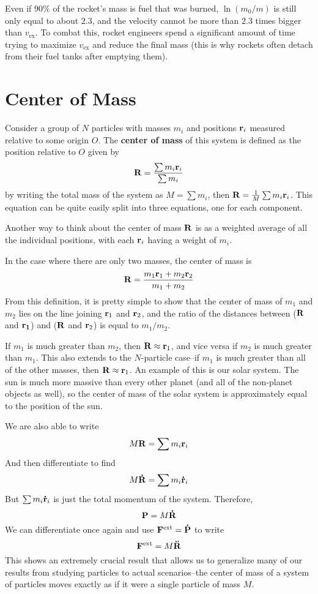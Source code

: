 Even if $90\%$ of the rocket's mass is fuel that was burned, $\ln(m_0/m)$ is still only equal to about $2.3$, and the velocity cannot be more than $2.3$ times bigger than $v_\text{ex}$. To combat this, rocket engineers spend a significant amount of time trying to maximize $v_\text{ex}$ and reduce the final mass (this is why rockets often detach from their fuel tanks after emptying them). 

\section{Center of Mass}
Consider a group of $N$ particles with masses $m_i$ and positions $\mathbf{r}_i$ measured relative to some origin $O$. The \textbf{center of mass} of this system is defined as the position relative to $O$ given by
\[ \mathbf{R} = \frac{\sum m_i\mathbf{r}_i}{\sum m_i}\]
by writing the total mass of the system as $M = \sum m_i$, then $\mathbf{R} = \frac{1}{M}\sum m_i\mathbf{r}_i$. This equation can be quite easily split into three equations, one for each component.

Another way to think about the center of mass $\mathbf{R}$ is as a weighted average of all the individual positions, with each $\mathbf{r}_i$ having a weight of $m_i$. 

In the case where there are only two masses, the center of mass is
\[ \mathbf{R} = \frac{m_1\mathbf{r}_1 + m_2\mathbf{r}_2}{m_1+m_2} \]
From this definition, it is pretty simple to show that the center of mass of $m_1$ and $m_2$ lies on the line joining $\mathbf{r}_1$ and $\mathbf{r}_2$, and the ratio of the distances between ($\mathbf{R}$ and $\mathbf{r_1}$) and ($\mathbf{R}$ and $\mathbf{r}_2$) is equal to $m_1/m_2$. 

If $m_1$ is much greater than $m_2$, then $\mathbf{R} \approx \mathbf{r}_1$, and vice versa if $m_2$ is much greater than $m_1$. This also extends to the $N$-particle case--if $m_1$ is much greater than all of the other masses, then $\mathbf{R}\approx \mathbf{r}_1$. An example of this is our solar system. The sun is much more massive than every other planet (and all of the non-planet objects as well), so the center of mass of the solar system is approximately equal to the position of the sun. 

We are also able to write
\[ M\mathbf{R} = \sum m_i\mathbf{r}_i\]
And then differentiate to find
\[ M\mathbf{\dot R} = \sum m_i \mathbf{\dot r}_i \]
But $\sum m_i\mathbf{\dot r}_i$ is just the total momentum of the system. Therefore,
\[ \mathbf{P} = M\mathbf{\dot R} \]
We can differentiate once again and use $\mathbf{F}^\text{ext} = \mathbf{\dot P}$ to write
\[ \mathbf{F}^\text{ext} = M\mathbf{\ddot R}\]
This shows an extremely crucial result that allows us to generalize many of our results from studying particles to actual scenarios--the center of mass of a system of particles moves exactly as if it were a single particle of mass $M$.

